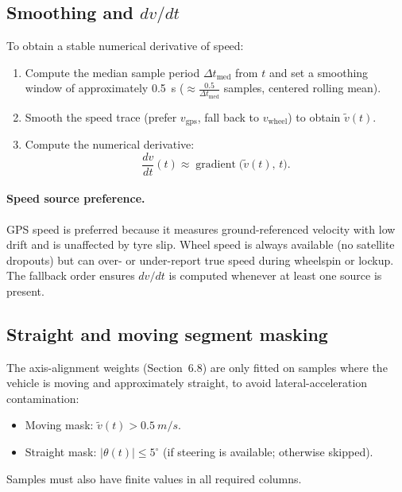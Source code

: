\documentclass[11pt,a4paper]{article}
\begin{document}
\subsection{Smoothing and $dv/dt$}
To obtain a stable numerical derivative of speed:
\begin{enumerate}
  \item Compute the median sample period $\Delta t_\text{med}$ from $t$ and set
        a smoothing window of approximately \SI{0.5}{s}
        ($\approx \frac{0.5}{\Delta t_\text{med}}$ samples, centered rolling
        mean).
  \item Smooth the speed trace (prefer $v_\text{gps}$, fall back to
        $v_\text{wheel}$) to obtain $\tilde{v}(t)$.
  \item Compute the numerical derivative:
        \[
          \frac{dv}{dt}(t) \approx \operatorname{gradient}\big(\tilde{v}(t),\,t\big).
        \]
\end{enumerate}

\paragraph{Speed source preference.}
GPS speed is preferred because it measures ground-referenced velocity with low
drift and is unaffected by tyre slip.  Wheel speed is always available (no
satellite dropouts) but can over- or under-report true speed during wheelspin or
lockup.  The fallback order ensures $dv/dt$ is computed whenever at least one
source is present.

\subsection{Straight and moving segment masking}
The axis-alignment weights (Section~6.8) are only fitted on samples where the
vehicle is moving and approximately straight, to avoid lateral-acceleration
contamination:
\begin{itemize}
  \item Moving mask: $\tilde{v}(t) > \SI{0.5}{m/s}$.
  \item Straight mask: $|\theta(t)| \le 5^\circ$ (if steering is available;
        otherwise skipped).
\end{itemize}
Samples must also have finite values in all required columns.
\end{document}
